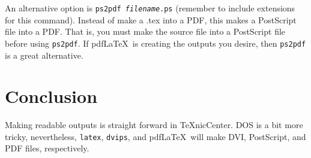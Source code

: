 \documentclass{article}
\begin{document}
An alternative option is \texttt{ps2pdf \textit{filename}.ps} (remember to include extensions for this command). Instead of make a .tex into a PDF, this makes a PostScript file into a PDF. That is, you must make the source file into a PostScript file before using \texttt{ps2pdf}. If pdf\LaTeX\ is creating the outputs you desire, then \texttt{ps2pdf} is a great alternative.

\section{Conclusion}

Making readable outputs is straight forward in \TeX nicCenter. DOS is a bit more tricky, nevertheless, \texttt{latex}, \texttt{dvips}, and pdf\LaTeX\ will make DVI, PostScript, and PDF files, respectively.
\end{document}
